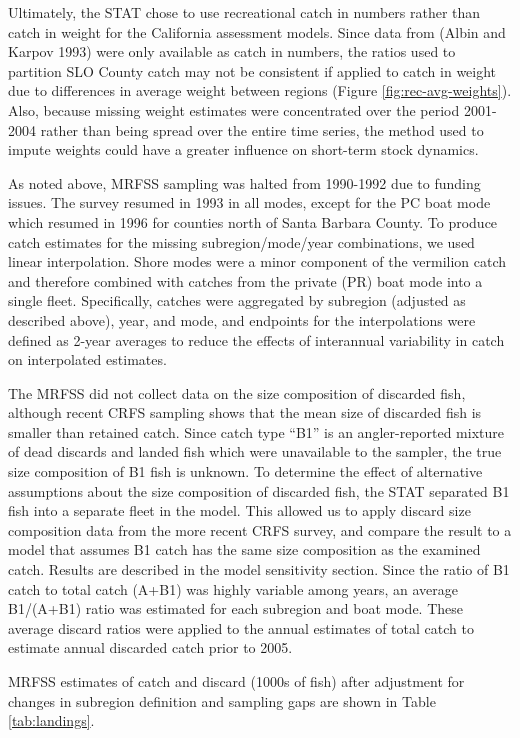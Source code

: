 \documentclass[
  english,
  a4paper,
]{article}
\begin{document}
Ultimately, the STAT chose to use recreational catch in numbers rather than catch in weight for the California assessment models. Since data from (Albin and Karpov 1993) were only available as catch in numbers, the ratios used to partition SLO County catch may not be consistent if applied to catch in weight due to differences in average weight between regions (Figure \ref{fig:rec-avg-weights}). Also, because missing weight estimates were concentrated over the period 2001-2004 rather than being spread over the entire time series, the method used to impute weights could have a greater influence on short-term stock dynamics.

As noted above, MRFSS sampling was halted from 1990-1992 due to funding issues.
The survey resumed in 1993 in all modes, except for the PC boat
mode which resumed in 1996 for counties north of Santa Barbara County. To
produce catch estimates for the missing subregion/mode/year combinations, we
used linear interpolation. Shore modes were a minor component of the vermilion
catch and therefore combined with catches from the private (PR) boat mode into
a single fleet. Specifically, catches were aggregated by subregion (adjusted as
described above), year, and mode, and endpoints for the interpolations were
defined as 2-year averages to reduce the effects of interannual variability
in catch on interpolated estimates.

The MRFSS did not collect data on the size composition of discarded fish, although recent CRFS sampling shows that the mean size of discarded fish is smaller than retained catch. Since catch type ``B1'' is an angler-reported mixture of dead discards and landed fish which were unavailable to the sampler, the true size composition of B1 fish is unknown. To determine the effect of alternative assumptions about the size composition of discarded fish, the STAT separated B1 fish into a separate fleet in the model. This allowed us to apply discard size composition data from the more recent CRFS survey, and compare the result to a model that assumes B1 catch has the same size composition as the examined catch. Results are described in the model sensitivity section. Since the ratio of B1 catch to total catch (A+B1) was highly variable among years, an average B1/(A+B1) ratio was estimated for each subregion and boat mode. These average discard ratios were applied to the annual estimates of total catch to estimate annual discarded catch prior to 2005.

MRFSS estimates of catch and discard (1000s of fish) after adjustment for
changes in subregion definition and sampling gaps are shown in Table \ref{tab:landings}.
\end{document}
